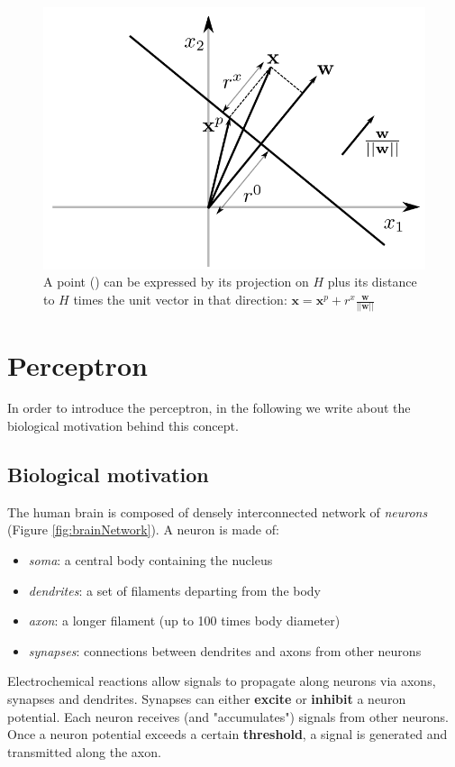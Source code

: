 \begin{figure}
    \centering
    \includegraphics[scale=0.4]{images/linearBinaryClassifier_geometricMargin.png}
    \caption{A point () can be expressed by its projection on $H$ plus its distance to $H$ times the unit vector in that direction: $\pmb{x} = \pmb{x}^p + r^x \frac{\pmb{w}}{||\pmb{w}||}$}
    \label{fig:linearBinaryClassifier_geometricMargin}
\end{figure}

\section{Perceptron}
In order to introduce the perceptron, in the following we write about the biological motivation behind this concept.

\subsection{Biological motivation}
The human brain is composed of densely interconnected network of \textit{neurons} (Figure \ref{fig:brainNetwork}). A neuron is made of:
\begin{itemize}
    \item \textit{soma}: a central body containing the nucleus
    \item \textit{dendrites}: a set of filaments departing from the body
    \item \textit{axon}: a longer filament (up to 100 times body diameter)
    \item \textit{synapses}: connections between dendrites and axons from other neurons
\end{itemize}
Electrochemical reactions allow signals to propagate along neurons via axons, synapses and dendrites. Synapses can either \textbf{excite} or \textbf{inhibit} a neuron potential. Each neuron receives (and "accumulates") signals from other neurons. Once a neuron potential exceeds a certain \textbf{threshold}, a signal is generated and transmitted along the axon.

